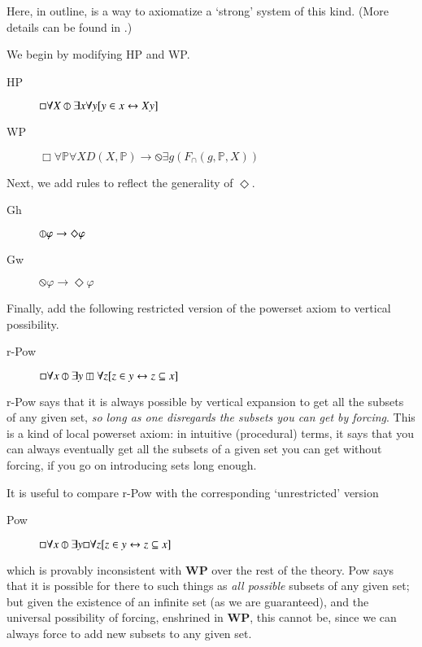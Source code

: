 \documentclass{article}
\begin{document}
Here, in outline, is a way to axiomatize a `strong' system of this kind.
(More details can be found in \citep{CS2021}.)

We begin by modifying HP and WP. 
\begin{description}
    \item[HP] $\Box \forall X \circledbar \exists x \forall y[y \in x \leftrightarrow Xy]$
\end{description}

\begin{description}
    \item[WP] $\Box \forall \mathbb{P} \forall X D(X, \mathbb{P}) \rightarrow \circledbslash \exists g(F_\cap(g, \mathbb{P}, X)) $
\end{description}

Next, we add rules to reflect the generality of $\Diamond$.
\begin{description}
    \item[Gh] $\circledbar \varphi \rightarrow \Diamond \varphi$
    \item[Gw] $\circledbslash \varphi \rightarrow \Diamond \varphi$
\end{description}
Finally, add the following restricted version of the 
powerset axiom to vertical possibility.
\begin{description}
    \item[r-Pow] $\Box \forall x \circledbar \exists y \boxbar \forall z[ z \in y \leftrightarrow z \subseteq x]$
\end{description}
r-Pow says that it is always possible by vertical expansion to get all the subsets of 
any given set, \emph{so long as one disregards the subsets you can get by forcing}. 
This is a kind of local powerset axiom: in intuitive (procedural) terms,
it says that you can always eventually get 
all the subsets of a given set you can get without forcing, if you go on introducing 
sets long enough.

It is useful to compare r-Pow with the corresponding `unrestricted' version 
\begin{description}
    \item[Pow] $\Box \forall x \circledbar \exists y \Box \forall z[ z \in y \leftrightarrow z \subseteq x]$
\end{description}
which is provably inconsistent with {\bf WP} over the rest of the theory. Pow says that 
it is possible for there to such things as \emph{all possible} subsets of any given 
set; but given the existence of an infinite set (as we are guaranteed), and the 
universal possibility of forcing, enshrined in {\bf WP}, this cannot be, since we can always force 
to add new subsets to any given set.
\end{document}
